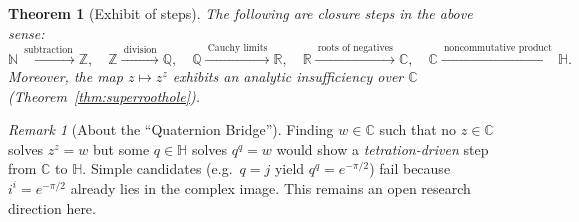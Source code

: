 \documentclass[12pt,a4paper]{article}
\newtheorem{theorem}{Theorem}
\theoremstyle{definition}
\theoremstyle{remark}
\newtheorem*{remark}{Remark}
\begin{document}
\begin{theorem}[Exhibit of steps]
\label{thm:ladder}
The following are closure steps in the above sense:
\[
\mathbb{N}\xrightarrow{\ \text{subtraction}\ }\mathbb{Z},\quad
\mathbb{Z}\xrightarrow{\ \text{division}\ }\mathbb{Q},\quad
\mathbb{Q}\xrightarrow{\ \text{Cauchy limits}\ }\mathbb{R},\quad
\mathbb{R}\xrightarrow{\ \text{roots of negatives}\ }\mathbb{C},\quad
\mathbb{C}\xrightarrow{\ \text{noncommutative product}\ }\mathbb{H}.
\]
Moreover, the map $z\mapsto z^z$ exhibits an analytic insufficiency over $\mathbb{C}$ (Theorem~\ref{thm:superroothole}).
\end{theorem}

\begin{remark}[About the ``Quaternion Bridge'']
Finding $w\in\mathbb{C}$ such that no $z\in\mathbb{C}$ solves $z^z=w$ but some $q\in\mathbb{H}$ solves $q^q=w$ would show a \emph{tetration-driven} step from $\mathbb{C}$ to $\mathbb{H}$. Simple candidates (e.g.\ $q=j$ yield $q^q=e^{-\pi/2}$) fail because $i^i=e^{-\pi/2}$ already lies in the complex image. This remains an open research direction here.
\end{remark}
\end{document}
